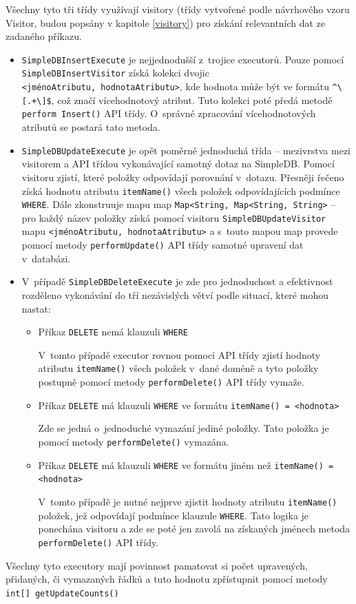 \documentclass[oneside,12pt,final]{fithesis2}
\begin{document}
Všechny tyto tři třídy využívají visitory (třídy vytvořené podle návrhového vzoru Visitor, budou popsány v kapitole \ref{visitory}) pro získání relevantních dat ze zadaného příkazu. 
\begin{itemize}
\item \texttt{SimpleDBInsertExecute} je nejjednodušší z~trojice executorů. Pouze pomocí \texttt{SimpleDBInsertVisitor} získá kolekci dvojic\\ \texttt{<jménoAtributu, hodnota\allowbreak Atributu>}, kde hodnota může být ve formátu \verb|^\[.+\]$|, což značí vícehodnotový atribut. Tuto kolekci poté předá metodě \texttt{perform Insert()} API třídy. O~správné zpracování vícehodnotových atributů se postará tato metoda.

\item\texttt{SimpleDBUpdateExecute} je opět poměrně jednoduchá třída -- mezivrstva mezi visitorem a API třídou vykonávající samotný dotaz na SimpleDB. Pomocí visitoru zjistí, které položky odpovídají porovnání v~dotazu. Přesněji řečeno získá hodnotu atributu \texttt{itemName()} všech položek odpovídajících podmínce \texttt{WHERE}. Dále zkonstruuje mapu map \texttt{Map<String, Map<String, String>} -- pro každý název položky získá pomocí visitoru \texttt{SimpleDBUpdate\allowbreak Visitor} mapu \texttt{<jménoAtributu, hodnotaAtributu>} a s~touto mapou map provede pomocí metody \texttt{performUpdate()} API třídy samotné upravení dat v~databázi.

\item V~případě \texttt{SimpleDBDeleteExecute} je zde pro jednoduchost a efektivnost rozděleno vykonávání do tří nezávislých větví podle situací, které mohou nastat:
\begin{itemize}
 \item Příkaz \texttt{DELETE} nemá klauzuli \texttt{WHERE}
 
  V~tomto případě executor rovnou pomocí API třídy zjistí hodnoty atributu \texttt{itemName()} všech položek v~dané doméně a tyto položky postupně pomocí metody \texttt{performDelete()} API třídy vymaže.
  
  \item Příkaz \texttt{DELETE} má klauzuli \texttt{WHERE} ve formátu \texttt{itemName() = <hodnota>}
  
  Zde se jedná o~jednoduché vymazání jediné položky. Tato položka je pomocí metody \texttt{performDelete()} vymazána.
  
\item Příkaz \texttt{DELETE} má klauzuli \texttt{WHERE} ve formátu jiném než \texttt{itemName() = <hodnota>}
  
  V~tomto případě je nutné nejprve zjistit hodnoty atributu \texttt{itemName()} položek, jež odpovídají podmínce klauzule \texttt{WHERE}. Tato logika je ponechána visitoru a zde se poté jen zavolá na získaných jménech metoda \texttt{performDelete()} API třídy.
\end{itemize}
\end{itemize}
Všechny tyto executory mají povinnost pamatovat si počet upravených, přidaných, či vymazaných řádků a tuto hodnotu zpřístupnit pomocí metody \texttt{int[] getUpdateCounts()}
\end{document}
